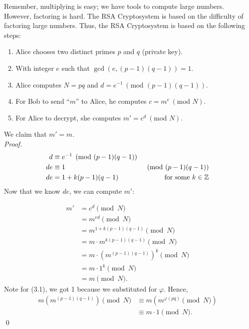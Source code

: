 Remember, multiplying is easy; we have tools to compute large numbers. However, factoring is hard. The RSA Cryptosystem is based on the difficulty of factoring large numbers. Thus, the RSA Cryptosystem is based on the following steps:
\begin{enumerate}
    \item Alice chooses two distinct primes \(p\) and \(q\) (private key).
    \item With integer \(e\) such that \(\gcd(e, (p-1)(q-1)) = 1\).
    \item Alice computes \(N = pq\) and \(d = e^{-1} \ (\text{mod } (p-1)(q-1))\).
    \item For Bob to send ``\(m\)'' to Alice, he computes \(c = m^e \ (\text{mod } N)\).
    \item For Alice to decrypt, she computes \(m' = c^d \ (\text{mod } N)\).
\end{enumerate}
\pfs

We claim that \(m' = m\). \\

\noindent \textit{Proof.} \begin{align*}
    d  & \equiv e^{-1}\pmod{(p-1)(q-1)}                             \\
    de & \equiv 1                       & \pmod{(p-1)(q-1)}         \\
    de & = 1 + k(p-1)(q-1)              & \text{for some } k \in \mathbb{Z}
\end{align*} Now that we know \(de\), we can compute \(m'\):

\begin{align*}
    m' & = c^d \pmod{N}                                  \\
       & = m^{ed} \pmod{N}                               \\
       & = m^{1 + k(p-1)(q-1)} \pmod{N}                  \\
       & = m \cdot m^{k(p-1)(q-1)} \pmod{N}              \\
       & = m \cdot (m^{(p-1)(q-1)})^k \pmod{N} \tag{3.1} \\
       & = m \cdot 1^k \pmod{N}                          \\
       & = m \pmod{N}.
\end{align*} Note for (3.1), we got 1 because we substituted for \(\varphi\). Hence, \begin{align*}
    m (m^{(p-1)(q-1)}) \pmod{N} & \equiv m (m^{\varphi(pq)} \pmod{N}) \\
                                & \equiv m \cdot 1 \pmod{N}.
\end{align*} \qed

